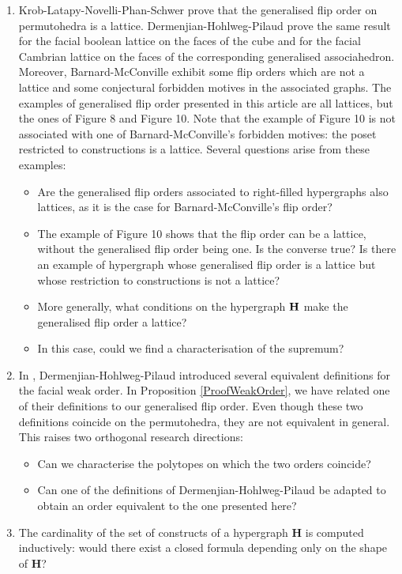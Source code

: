 \documentclass{article}
\theoremstyle{plain}
\theoremstyle{definition}
\begin{document}
\begin{enumerate}
\item Krob-Latapy-Novelli-Phan-Schwer \cite{KLNPS} prove that the generalised flip order on permutohedra is a lattice. Dermenjian-Hohlweg-Pilaud \cite{DHP-WFO} prove the same result for the facial boolean lattice on the faces of the cube and for the facial Cambrian lattice on the faces of the corresponding generalised associahedron. Moreover, Barnard-McConville \cite{BM} exhibit some flip orders which are not a lattice and some conjectural forbidden motives in the associated graphs. The examples of generalised flip order presented in this article are all lattices, but the ones of Figure 8 and Figure 10. Note that the example of Figure 10 is not associated with one of Barnard-McConville's forbidden motives: the poset restricted to constructions is a lattice. Several questions arise from these examples:
\begin{itemize}
\item Are the generalised flip orders associated to right-filled hypergraphs also lattices, as it is the case for Barnard-McConville's flip order?
\item The example of Figure 10 shows that the flip order can be a lattice, without the generalised flip order being one. Is the converse true? Is there an example of hypergraph whose generalised flip order is a lattice but whose restriction to constructions is not a lattice? 
\item More generally, what conditions on the hypergraph ${\bf H}$ make the generalised flip order a lattice?
\item In this case, could we find a characterisation of the supremum?
\end{itemize}
\item In \cite{DHP-WFO}, Dermenjian-Hohlweg-Pilaud introduced  several equivalent definitions for the facial weak order. In Proposition \ref{ProofWeakOrder}, we have related one of their definitions to our generalised flip order. Even though these two definitions coincide on the permutohedra, they are not equivalent in general. This raises two orthogonal research directions:
\begin{itemize}
\item Can we characterise the polytopes on which the two orders coincide?
\item  Can one of the definitions of Dermenjian-Hohlweg-Pilaud be adapted to obtain an order equivalent to the one presented here? 
\end{itemize} 
\item The cardinality of the set of constructs of a hypergraph {\bf H} is computed inductively: would there exist a closed formula depending only on the shape of {\bf H}?

\end{enumerate}
\end{document}
